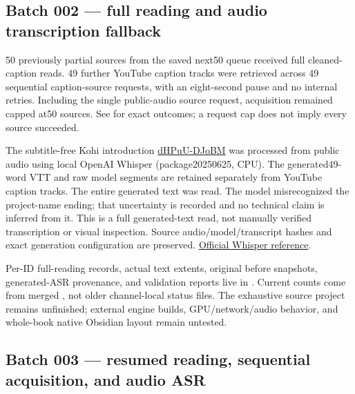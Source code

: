 \subsection{Batch 002 --- full reading and audio transcription fallback}\label{appendix-877738f6f4d2-batch-002-full-reading-and-audio-transcription-fallback}

\hypertarget{appendix-877738f6f4d2-batch-002-full-reading-and-audio-transcription-fallback}{}

50 previously partial sources from the saved next50 queue received full cleaned-caption reads. 49 further YouTube caption tracks were retrieved across 49 sequential caption-source requests, with an eight-second pause and no internal retries. Including the single public-audio source request, acquisition remained capped at50 sources. See  for exact outcomes; a request cap does not imply every source succeeded.

The subtitle-free Kohi introduction \href{https://www.youtube.com/watch?v=dHPuU-DJoBM}{dHPuU-DJoBM} was processed from public audio using local OpenAI Whisper  (package20250625, CPU). The generated49-word VTT and raw model segments are retained separately from YouTube caption tracks. The entire generated text was read. The model misrecognized the project-name ending; that uncertainty is recorded and no technical claim is inferred from it. This is a full generated-text read, not manually verified transcription or visual inspection. Source audio/model/transcript hashes and exact generation configuration are preserved. \href{https://github.com/openai/whisper}{Official Whisper reference}.

Per-ID full-reading records, actual text extents, original before snapshots, generated-ASR provenance, and validation reports live in . Current counts come from merged , not older channel-local status files. The exhaustive source project remains unfinished; external engine builds, GPU/network/audio behavior, and whole-book native Obsidian layout remain untested.

\subsection{Batch 003 --- resumed reading, sequential acquisition, and audio ASR}\label{appendix-877738f6f4d2-batch-003-resumed-reading-sequential-acquisition-and-audio-asr}

